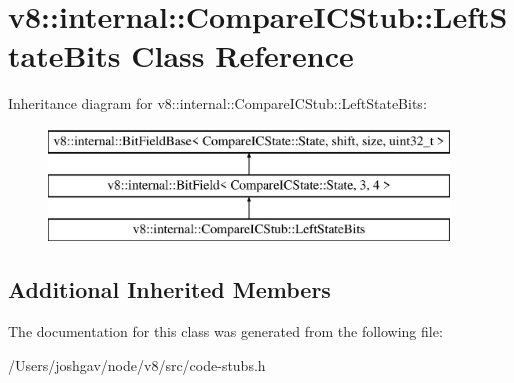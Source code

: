 \hypertarget{classv8_1_1internal_1_1_compare_i_c_stub_1_1_left_state_bits}{}\section{v8\+:\+:internal\+:\+:Compare\+I\+C\+Stub\+:\+:Left\+State\+Bits Class Reference}
\label{classv8_1_1internal_1_1_compare_i_c_stub_1_1_left_state_bits}
Inheritance diagram for v8\+:\+:internal\+:\+:Compare\+I\+C\+Stub\+:\+:Left\+State\+Bits\+:\begin{figure}[H]
\begin{center}
\leavevmode
\includegraphics[height=3.000000cm]{classv8_1_1internal_1_1_compare_i_c_stub_1_1_left_state_bits}
\end{center}
\end{figure}
\subsection*{Additional Inherited Members}


The documentation for this class was generated from the following file\+:\begin{DoxyCompactItemize}
\item 
/\+Users/joshgav/node/v8/src/code-\/stubs.\+h\end{DoxyCompactItemize}
